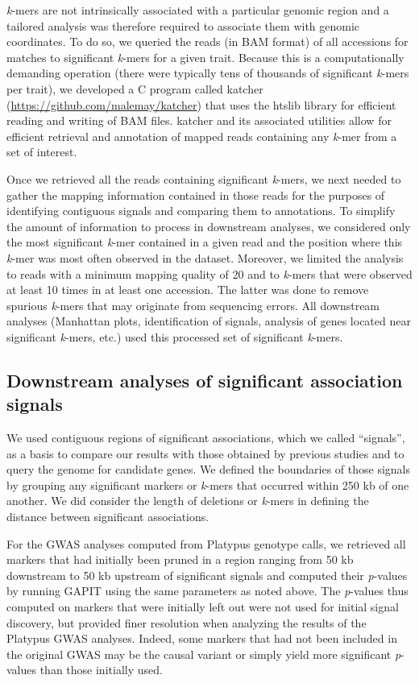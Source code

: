 \emph{k}-mers are not intrinsically associated with a particular genomic region
and a tailored analysis was therefore required to associate them with genomic
coordinates. To do so, we queried the reads (in BAM format) of all accessions for matches
to significant \emph{k}-mers for a given trait. Because this is a
computationally demanding operation (there were typically tens of thousands of
significant \emph{k}-mers per trait), we developed a C program called katcher
(\url{https://github.com/malemay/katcher}) that
uses the htslib library \citep{bonfield2021} for efficient reading and
writing of BAM files. katcher and its associated utilities allow for efficient
retrieval and annotation of mapped reads containing any \emph{k}-mer from a set
of interest.

Once we retrieved all the reads containing significant \emph{k}-mers, we next
needed to gather the mapping information contained in those reads for the
purposes of identifying contiguous signals and comparing them to annotations. To
simplify the amount of information to process in downstream analyses, we
considered only the most significant \emph{k}-mer contained in a given read and
the position where this \emph{k}-mer was most often observed in
the dataset. Moreover, we limited the analysis to reads with a minimum mapping
quality of 20 and to \emph{k}-mers that were observed at least 10 times in at
least one accession. The latter was done to remove spurious \emph{k}-mers that may originate
from sequencing errors. All downstream analyses (Manhattan plots,
identification of signals, analysis of genes located near significant
\emph{k}-mers, etc.) used this processed set of significant \emph{k}-mers.

\subsection*{Downstream analyses of significant association signals}
\label{sv-gwas-methods-downstream}

We used contiguous regions of significant associations, which we called
``signals'', as a basis to compare our results with those obtained by previous
studies and to query the genome for candidate genes. We defined the boundaries
of those signals by grouping any significant markers or \emph{k}-mers that
occurred within 250 kb of one another.  We did consider the length of deletions
or \emph{k}-mers in defining the distance between significant associations.

For the GWAS analyses computed from Platypus genotype calls, we retrieved all
markers that had initially been pruned in a region ranging from 50 kb
downstream to 50 kb upstream of significant signals and computed their
\emph{p}-values by running GAPIT using the same parameters as noted above. The
\emph{p}-values thus computed on markers that were initially left out were not
used for initial signal discovery, but provided finer resolution when analyzing
the results of the Platypus GWAS analyses. Indeed, some markers that had not
been included in the original GWAS may be the causal variant or simply yield
more significant \emph{p}-values than those initially used.

